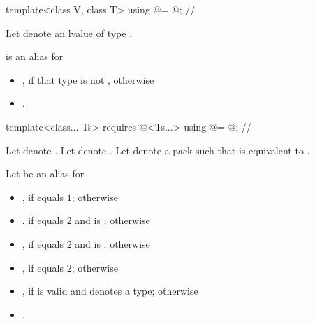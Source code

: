 \begin{itemdecl}
template<class V, class T> using @\makecompatiblesimdt@ = @\seebelow@; // \expos
\end{itemdecl}
\begin{itemdescr}
  \pnum
  Let  denote an lvalue of type .

  \pnum {} is an alias for
  \begin{itemize}
    \item {}, if that type is not , otherwise
    \item {}.
  \end{itemize}
\end{itemdescr}

\begin{itemdecl}
template<class... Ts>
  requires @\mathfloatingpoint@<Ts...>
    using @\mathcommonsimd@ = @\seebelow@; // \expos
\end{itemdecl}
\begin{itemdescr}
  \pnum
  Let  denote .
  Let  denote .
  Let  denote a pack such that  is equivalent to .

  \pnum
  Let  be an alias for
  \begin{itemize}
    \item {}, if  equals $1$; otherwise

    \item {}, if 
      equals $2$ and  is ;
      otherwise

    \item {}, if 
      equals $2$ and  is ; otherwise

    \item {}, if 
      equals $2$; otherwise

    \item {}, if  is valid and denotes a type; otherwise

    \item {}.
  \end{itemize}
\end{itemdescr}


